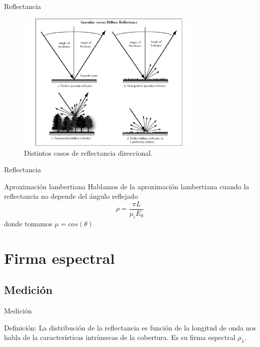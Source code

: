 \documentclass[handout]{beamer}
\begin{document}
\begin{frame}{Reflectancia}
  \begin{figure}
  \centering
  \includegraphics[width=0.8\textwidth]{imagenes/difusa.png}
  \caption{Distintos casos de reflectancia direccional.}
  \end{figure}
\end{frame}

\begin{frame}{Reflectancia}
  \begin{block}{Aproximaci\'on lambertiana}
    Hablamos de la aproximaci\'on lambertiana cuando la reflectancia no depende del \'angulo reflejado
    $$\rho = \frac{\pi L}{\mu_i E_0}$$
    donde tomamos $\mu=cos(\theta)$
  \end{block}
\end{frame}

\section{Firma espectral}
\subsection{Medici\'on}
\begin{frame}{Medici\'on}
  \begin{block}{Definici\'on:}
    La distribuci\'on de la reflectancia es funci\'on de la longitud de onda nos habla de la caracter\'isticas intr\'insecas de la cobertura. Es su firma espectral $\rho_\lambda$.
  \end{block}
\end{frame}
\end{document}
